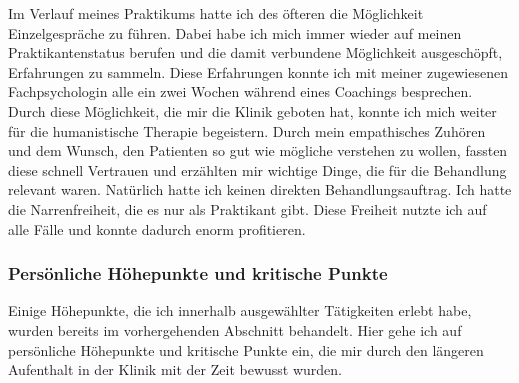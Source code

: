 Im Verlauf meines Praktikums hatte ich des öfteren die Möglichkeit Einzelgespräche zu führen. Dabei habe ich mich immer wieder auf meinen Praktikantenstatus berufen und die damit verbundene Möglichkeit ausgeschöpft, Erfahrungen zu sammeln. Diese Erfahrungen konnte ich mit meiner zugewiesenen Fachpsychologin alle ein zwei Wochen während eines Coachings besprechen. Durch diese Möglichkeit, die mir die Klinik geboten hat, konnte ich mich weiter für die humanistische Therapie begeistern. Durch mein empathisches Zuhören und dem Wunsch, den Patienten so gut wie mögliche verstehen zu wollen, fassten diese schnell Vertrauen und erzählten mir wichtige Dinge, die für die Behandlung relevant waren. Natürlich hatte ich keinen direkten Behandlungsauftrag. Ich hatte die Narrenfreiheit, die es nur als Praktikant gibt. Diese Freiheit nutzte ich auf alle Fälle und konnte dadurch enorm profitieren.

\subsubsection{Persönliche Höhepunkte und kritische Punkte} \label{sec:Höhepunkte}
Einige Höhepunkte, die ich innerhalb ausgewählter Tätigkeiten erlebt habe, wurden bereits im vorhergehenden Abschnitt behandelt. Hier gehe ich auf persönliche Höhepunkte und kritische Punkte ein, die mir durch den längeren Aufenthalt in der Klinik mit der Zeit bewusst wurden. 

